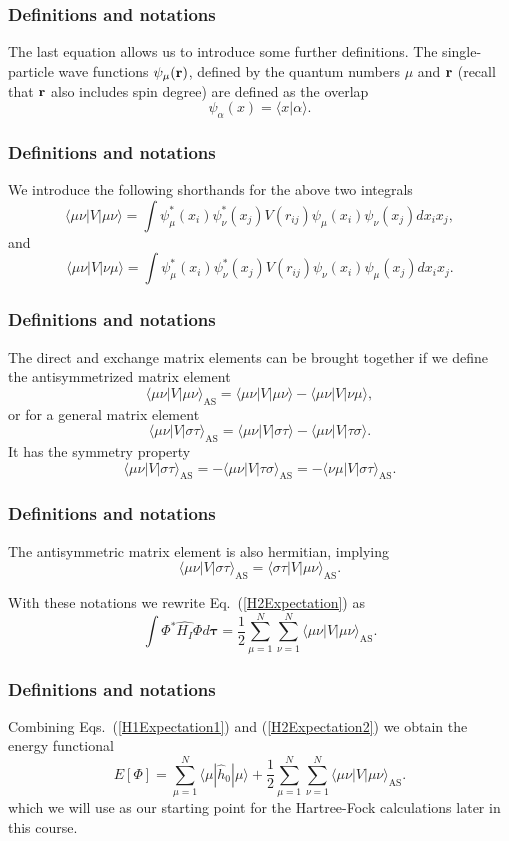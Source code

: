 \frame
{
  \frametitle{Definitions and notations}
\begin{small}
{\scriptsize
The last equation allows us to  introduce some further definitions.  
The single-particle wave functions $\psi_{\mu}({\bf r})$, defined by the quantum numbers $\mu$ and ${\bf r}$
(recall that ${\bf r}$ also includes spin degree)   are defined as the overlap 
\[
   \psi_{\alpha}(x)  = \langle x | \alpha \rangle .
\]

}
\end{small}
}
\frame
{
  \frametitle{Definitions and notations}
\begin{small}
{\scriptsize
We introduce the following shorthands for the above two integrals
\[
\langle \mu\nu|V|\mu\nu\rangle =  \int \psi_{\mu}^*(x_i)\psi_{\nu}^*(x_j)V(r_{ij})\psi_{\mu}(x_i)\psi_{\nu}(x_j)
    dx_ix_j,
\]
and 
\[
\langle \mu\nu|V|\nu\mu\rangle = \int \psi_{\mu}^*(x_i)\psi_{\nu}^*(x_j)
  V(r_{ij})\psi_{\nu}(x_i)\psi_{\mu}(x_j)
  dx_ix_j.  
\]
}
\end{small}
}
\frame
{
  \frametitle{Definitions and notations}
\begin{small}
{\scriptsize
The direct and exchange matrix elements can be  brought together if we define the antisymmetrized matrix element
\[
\langle \mu\nu|V|\mu\nu\rangle_{\mathrm{AS}}= \langle \mu\nu|V|\mu\nu\rangle-\langle \mu\nu|V|\nu\mu\rangle,
\]
or for a general matrix element  
\[
\langle \mu\nu|V|\sigma\tau\rangle_{\mathrm{AS}}= \langle \mu\nu|V|\sigma\tau\rangle-\langle \mu\nu|V|\tau\sigma\rangle.
\]
It has the symmetry property
\[
\langle \mu\nu|V|\sigma\tau\rangle_{\mathrm{AS}}= -\langle \mu\nu|V|\tau\sigma\rangle_{\mathrm{AS}}=-\langle \nu\mu|V|\sigma\tau\rangle_{\mathrm{AS}}.
\]
}
\end{small}
}
\frame
{
  \frametitle{Definitions and notations}
\begin{small}
{\scriptsize
The antisymmetric matrix element is also hermitian, implying 
\[
\langle \mu\nu|V|\sigma\tau\rangle_{\mathrm{AS}}= \langle \sigma\tau|V|\mu\nu\rangle_{\mathrm{AS}}.
\]

With these notations we rewrite Eq.~(\ref{H2Expectation}) as 
\begin{equation}
  \int \Phi^*\hat{H_I}\Phi d\mathbf{\tau} 
  = \frac{1}{2}\sum_{\mu=1}^N\sum_{\nu=1}^N \langle \mu\nu|V|\mu\nu\rangle_{\mathrm{AS}}.
\label{H2Expectation2}
\end{equation}

}
\end{small}
}
\frame
{
  \frametitle{Definitions and notations}
\begin{small}
{\scriptsize
Combining Eqs.~(\ref{H1Expectation1}) and
(\ref{H2Expectation2}) we obtain the energy functional 
\begin{equation}
  E[\Phi] 
  = \sum_{\mu=1}^N \langle \mu | \hat{h}_0 | \mu \rangle +
  \frac{1}{2}\sum_{{\mu}=1}^N\sum_{{\nu}=1}^N \langle \mu\nu|V|\mu\nu\rangle_{\mathrm{AS}}.
\label{FunctionalEPhi}
\end{equation}
which we will use as our starting point for the Hartree-Fock calculations later in this course. 
}
\end{small}
}

